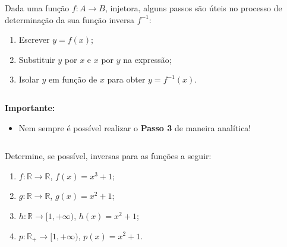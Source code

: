 \begin{frame}
  \begin{definition}
    Dada uma função $f:A\rightarrow B$, injetora, alguns passos são úteis no processo de determinação da sua função inversa $f^{-1}$:
    \begin{enumerate}
      \item Escrever $y=f(x)$;
      \item Substituir $y$ por $x$ e $x$ por $y$ na expressão;
      \item Isolar $y$ em função de $x$ para obter $y=f^{-1}(x)$.
    \end{enumerate}
  \end{definition}
  \begin{columns}[onlytextwidth]
    \begin{column}{0.49\textwidth}
      \begin{highlight}
        \textbf{Importante:}
        \begin{itemize}
          \item Nem sempre é possível realizar o \textbf{Passo 3} de maneira analítica!
        \end{itemize}
      \end{highlight}
    \end{column}
    \begin{column}{0.49\textwidth}
    \end{column}
  \end{columns}
\end{frame}

\begin{frame}
  \begin{example}
    Determine, se possível, inversas para as funções a seguir:
  \end{example}
  \begin{enumerate}
    \item $f:\mathbb{R}\rightarrow\mathbb{R}$, $f(x)=x^{3}+1$;
    \item $g:\mathbb{R}\rightarrow\mathbb{R}$, $g(x)=x^{2}+1$;
    \item $h:\mathbb{R}\rightarrow[1,+\infty)$, $h(x)=x^{2}+1$;
    \item $p:\mathbb{R}_{+}\rightarrow[1,+\infty)$, $p(x)=x^{2}+1$.
  \end{enumerate}
\end{frame}

